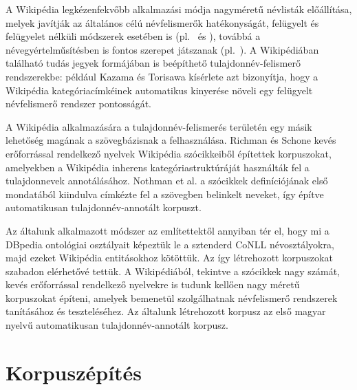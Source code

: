 \documentclass{llncs}
\begin{document}
A Wikipédia legkézenfekvőbb alkalmazási módja nagyméretű névlisták előállítása, melyek javítják az általános célú névfelismerők hatékonyságát, felügyelt és felügyelet nélküli módszerek esetében is (pl.~\cite{Toral:06} és \cite{Nadeau:06}), továbbá a névegyértelműsítésben is fontos szerepet játszanak (pl.~\cite{Bunescu:06}). A Wikipédiában található tudás jegyek formájában is beépíthető tulajdonnév-felismerő rendszerekbe: például Kazama és Torisawa \cite{KaTo07} kísérlete azt bizonyítja, hogy a Wikipédia kategóriacímkéinek automatikus kinyerése növeli egy felügyelt névfelismerő rendszer pontosságát. 

A Wikipédia alkalmazására a tulajdonnév-felismerés területén egy másik lehetőség magának a szövegbázisnak a felhasználása. Richman és Schone \cite{Richman:08} kevés erőforrással rendelkező nyelvek Wikipédia szócikkeiből építettek korpuszokat, amelyekben a Wikipédia inherens kategóriastruktúráját használták fel a tulajdonnevek annotálásához. Nothman et al. \cite{Nothman:08} a szócikkek definíciójának első mondatából kiindulva címkézte fel a szövegben belinkelt neveket, így építve automatikusan tulajdonnév-annotált korpuszt. 

Az általunk alkalmazott módszer az említettektől annyiban tér el, hogy mi a DBpedia ontológiai osztályait képeztük le a sztenderd CoNLL névosztályokra, majd ezeket Wikipédia entitásokhoz kötöttük. Az így létrehozott korpuszokat szabadon elérhetővé tettük. 
A Wikipédiából, tekintve a szócikkek nagy számát, kevés erőforrással rendelkező nyelvekre is tudunk kellően nagy méretű korpuszokat építeni, amelyek bemenetül szolgálhatnak névfelismerő rendszerek tanításához és teszteléséhez. Az általunk létrehozott korpusz az első magyar nyelvű automatikusan tulajdonnév-annotált korpusz. 

\section{Korpuszépítés}
\label{corpusbuilding}

\end{document}

